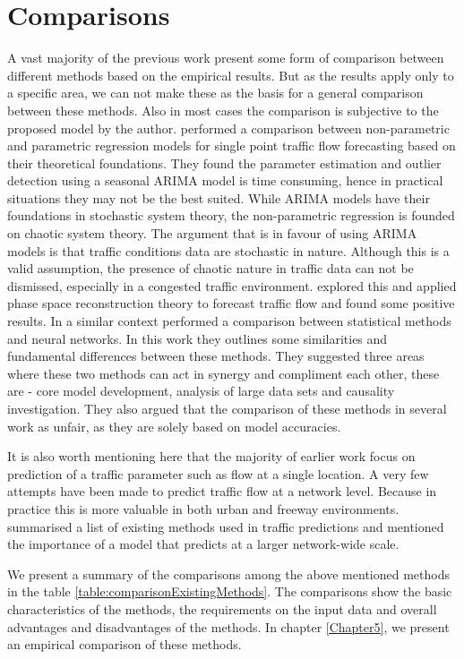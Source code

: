\section{Comparisons}
A vast majority of the previous work present some form of comparison between different methods based
on the empirical results. But as the results apply only to a specific area, we can not make these
as the basis for a general comparison between these methods. Also in most cases the comparison is
subjective to the proposed model by the author. \citet{smith2002comparison} performed
a comparison between non-parametric and parametric regression models for single point traffic flow
forecasting based on their theoretical foundations. They found the parameter estimation and outlier
detection using a seasonal ARIMA model is time consuming, hence in practical situations they may not be the
best suited. While ARIMA models have their foundations in stochastic system theory, the non-parametric
regression is founded on chaotic system theory. The argument that is in favour of using ARIMA models
is that traffic conditions data are stochastic in nature. Although this is a valid assumption, the
presence of chaotic nature in traffic data can not be dismissed, especially in a congested traffic
environment. \citet{hu2003applicable} explored this and applied phase space reconstruction theory to
forecast traffic flow and found some positive results. In a similar context \citet{karlaftis2011statistical}
performed a comparison between statistical methods and neural networks. In this work they outlines some
similarities and fundamental differences between these methods. They suggested three areas where these
two methods can act in synergy and compliment each other, these are - core model development, analysis
of large data sets and causality investigation. They also argued that the comparison of these methods in
several work as unfair, as they are solely based on model accuracies.

It is also worth mentioning here that the majority of earlier work focus on prediction of a traffic
parameter such as flow at a single location. A very few attempts have been made to predict traffic flow
at a network level. Because in practice this is more valuable in both urban and freeway environments.
\citet{van2007short} summarised a list of existing methods used in traffic predictions and mentioned
the importance of a model that predicts at a larger network-wide scale.

We present a summary of the comparisons among the above mentioned methods in the table
\ref{table:comparisonExistingMethods}. The comparisons show the basic characteristics of the methods,
the requirements on the input data and overall advantages and disadvantages of the methods. In
chapter \ref{Chapter5}, we present an empirical comparison of these methods.

